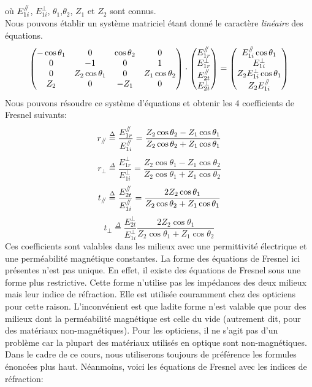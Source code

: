 où $E_{1i}^{\mathbin{/\mkern-5mu/}}$, $E_{1i}^{\perp}$, $\theta_{1}$,$\theta_{2}$, $Z_1$ et $Z_2$ sont connus. \\
Nous pouvons établir un système matriciel étant donné le caractère \textit{linéaire} des équations.
	$$
	\begin{pmatrix}
	-\cos \theta_{1} & 0 & \cos \theta_{2}& 0\\
	0 & -1 & 0 & 1\\
	0 & Z_2\cos \theta_{1} & 0 & Z_1\cos \theta_{2}\\ 
	Z_2 & 0 & -Z_1 & 0
	\end{pmatrix}
	\cdot
	\begin{pmatrix}
	E_{1r}^{\mathbin{/\mkern-5mu/}}\\
	E_{1r}^{\perp}\\
	E_{2t}^{\mathbin{/\mkern-5mu/}} \\ 
	E_{2t}^{\perp}
	\end{pmatrix}
	=
	\begin{pmatrix}
	E_{1i}^{\mathbin{/\mkern-5mu/}} \cos \theta_{1}\\
	E_{1i}^{\perp} \\
	Z_2E_{1i}^{\perp} \cos \theta_{1} \\
	Z_2E_{1i}^{\mathbin{/\mkern-5mu/}}
	\end{pmatrix}
	$$
Nous pouvons résoudre ce système d'équations et obtenir les 4 coefficients de Fresnel suivants:
\[r_{\mathbin{/\mkern-5mu/}} \overset{\Delta}= \frac{E_{1r}^{\mathbin{/\mkern-5mu/}}}{E_{1i}^{\mathbin{/\mkern-5mu/}}} = \frac{Z_{2}\cos \theta_{2} - Z_{1} \cos \theta_{1} }{Z_{2} \cos \theta_{2} + Z_{1} \cos \theta_{1} } \]
\[r_{\perp} \overset{\Delta}= \frac{E_{1r}^{\perp}}{E_{1i}^{\perp}} = \frac{Z_{2}\cos \theta_{1} - Z_{1} \cos \theta_{2} }{Z_{2} \cos \theta_{1} + Z_{1} \cos \theta_{2}}\]
\[t_{\mathbin{/\mkern-5mu/}} \overset{\Delta}= \frac{E_{2t}^{\mathbin{/\mkern-5mu/}}}{E_{1i}^{\mathbin{/\mkern-5mu/}}} = \frac{2 Z_{2} \cos \theta_{1} }{Z_{2} \cos \theta_{2} + Z_{1} \cos \theta_{1}} \]
\[t_{\perp} \overset{\Delta}= \frac{E_{2t}^{\perp}}{E_{1i}^{\perp}} \frac{2 Z_{2} \cos \theta_{1} }{Z_{2} \cos \theta_{1} + Z_{1} \cos \theta_{2}}\]
Ces coefficients sont valables dans les milieux avec une permittivité électrique et une perméabilité magnétique constantes. La forme des équations de Fresnel ici présentes n'est pas unique. En effet, il existe des équations de Fresnel sous une forme plus restrictive. Cette forme n'utilise pas les impédances des deux milieux mais leur indice de réfraction. Elle est utilisée couramment chez des opticiens pour cette raison. L'inconvénient est que ladite forme n'est valable que pour des milieux dont la perméabilité magnétique est celle du vide (autrement dit, pour des matériaux non-magnétiques). Pour les opticiens, il ne s'agit pas d'un problème car la plupart des matériaux utilisés en optique sont non-magnétiques. Dans le cadre de ce cours, nous utiliserons toujours de préférence les formules énoncées plus haut. Néanmoins, voici les équations de Fresnel avec les indices de réfraction: 

